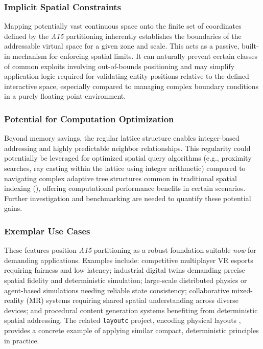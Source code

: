 \documentclass[10pt]{article}
\def\AAAB{\textit{A15}}
\begin{document}
\subsubsection{Implicit Spatial Constraints}\label{subsubsec:apps-constraints}
Mapping potentially vast continuous space onto the finite set of coordinates defined by the \AAAB{} partitioning inherently establishes the boundaries of the addressable virtual space for a given zone and scale. This acts as a passive, built-in mechanism for enforcing spatial limits. It can naturally prevent certain classes of common exploits involving out-of-bounds positioning and may simplify application logic required for validating entity positions relative to the defined interactive space, especially compared to managing complex boundary conditions in a purely floating-point environment.

\subsubsection{Potential for Computation Optimization}\label{subsubsec:apps-optimization}
Beyond memory savings, the regular lattice structure enables integer-based addressing and highly predictable neighbor relationships. This regularity could potentially be leveraged for optimized spatial query algorithms (e.g., proximity searches, ray casting within the lattice using integer arithmetic) compared to navigating complex adaptive tree structures common in traditional spatial indexing (), offering computational performance benefits in certain scenarios. Further investigation and benchmarking are needed to quantify these potential gains.

\subsubsection{Exemplar Use Cases}\label{subsubsec:apps-usecases}
These features position \AAAB{} partitioning as a robust foundation suitable \emph{now} for demanding applications. Examples include: competitive multiplayer VR esports requiring fairness and low latency; industrial digital twins demanding precise spatial fidelity and deterministic simulation; large-scale distributed physics or agent-based simulations needing reliable state consistency; collaborative mixed-reality (MR) systems requiring shared spatial understanding across diverse devices; and procedural content generation systems benefiting from deterministic spatial addressing. The related \texttt{layoutc} project, encoding physical layouts \cite{Risinger2024Layoutc}, provides a concrete example of applying similar compact, deterministic principles in practice.
\end{document}
